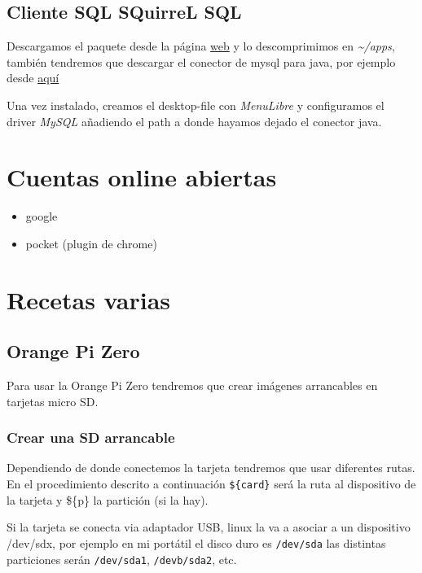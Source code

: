 \documentclass[12pt,spanish,]{article}
\providecommand{\tightlist}{%
  \setlength{\itemsep}{0pt}\setlength{\parskip}{0pt}}
\begin{document}
\subsection{Cliente SQL SQuirreL SQL}\label{cliente-sql-squirrel-sql}

Descargamos el paquete desde la página
\href{http://squirrel-sql.sourceforge.net/}{web} y lo descomprimimos en
\emph{\textasciitilde{}/apps}, también tendremos que descargar el
conector de mysql para java, por ejemplo desde
\href{http://dev.mysql.com/downloads/connector/j/3.0.html}{aquí}

Una vez instalado, creamos el desktop-file con \emph{MenuLibre} y
configuramos el driver \emph{MySQL} añadiendo el path a donde hayamos
dejado el conector java.

\section{Cuentas online abiertas}\label{cuentas-online-abiertas}

\begin{itemize}
\tightlist
\item
  google
\item
  pocket (plugin de chrome)
\end{itemize}

\section{Recetas varias}\label{recetas-varias}

\subsection{Orange Pi Zero}\label{orange-pi-zero}

Para usar la Orange Pi Zero tendremos que crear imágenes arrancables en
tarjetas micro SD.

\subsubsection{Crear una SD arrancable}\label{crear-una-sd-arrancable}

Dependiendo de donde conectemos la tarjeta tendremos que usar diferentes
rutas. En el procedimiento descrito a continuación \texttt{\$\{card\}}
será la ruta al dispositivo de la tarjeta y \$\{p\} la partición (si la
hay).

Si la tarjeta se conecta via adaptador USB, linux la va a asociar a un
dispositivo /dev/sdx, por ejemplo en mi portátil el disco duro es
\texttt{/dev/sda} las distintas particiones serán \texttt{/dev/sda1},
\texttt{/devb/sda2}, etc.
\end{document}
